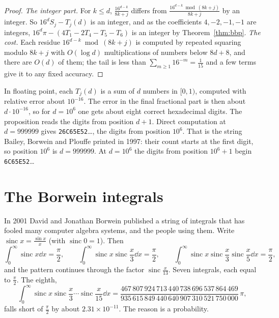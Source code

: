 \begin{proof}
\emph{The integer part.}
For $k\le d$, $\frac{16^{d-k}}{8k+j}$ differs from $\frac{16^{d-k}\bmod(8k+j)}{8k+j}$ by an integer. So $16^dS_j-T_j(d)$ is an integer, and as the coefficients $4,-2,-1,-1$ are integers,
$16^d\pi-(4T_1-2T_4-T_5-T_6)$ is an integer by Theorem~\ref{thm:bbp}.
\emph{The cost.}
Each residue $16^{d-k}\bmod(8k+j)$ is computed by repeated squaring modulo $8k+j$ with $O(\log d)$ multiplications of
numbers below $8d+8$, and there are $O(d)$ of them; the tail is less than $\sum_{m\ge1}16^{-m}=\frac1{15}$ and a few terms give it to any fixed accuracy.
\end{proof}

In floating point, each $T_j(d)$ is a sum of $d$ numbers in $[0,1)$, computed with relative error about $10^{-16}$. The error in the final fractional part
is then about $d\cdot10^{-16}$, so for $d=10^6$ one gets about eight correct hexadecimal digits. The proposition reads the digits from position $d+1$. Direct computation at $d=999999$ gives
\texttt{26C65E52}\dots, the digits from position $10^6$. That is the string Bailey, Borwein and Plouffe printed in 1997: their count starts at the first digit, so position $10^6$ is $d=999999$. At $d=10^6$ the digits from position $10^6+1$ begin \texttt{6C65E52}\dots



\section{The Borwein integrals}

In 2001 David and Jonathan Borwein published a string of integrals that has fooled many computer algebra systems, and the people using them. Write
$\operatorname{sinc}x=\frac{\sin x}x$ (with $\operatorname{sinc}0=1$). Then
\[
\int_0^\infty\operatorname{sinc}x\dd x=\frac\pi2,\qquad\int_0^\infty\operatorname{sinc}x\operatorname{sinc}\frac x3\dd x=\frac\pi2,\qquad
\int_0^\infty\operatorname{sinc}x\operatorname{sinc}\frac x3\operatorname{sinc}\frac x5\dd x=\frac\pi2,
\]
and the pattern continues through the factor $\operatorname{sinc}\frac x{13}$. Seven integrals, each equal to $\frac\pi2$. The eighth,
\[
\int_0^\infty\operatorname{sinc}x\operatorname{sinc}\frac x3\cdots\operatorname{sinc}\frac x{15}\dd x
=\frac{467\,807\,924\,713\,440\,738\,696\,537\,864\,469}{935\,615\,849\,440\,640\,907\,310\,521\,750\,000}\,\pi,
\]
falls short of $\frac\pi2$ by about $2.31\times10^{-11}$. The reason is a probability.

